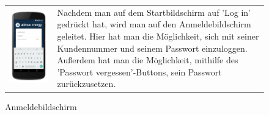 \begin{figure}[h]
\begin{tabularx}{\textwidth}{X  X}
	\includegraphics[scale = 0.155]{img/AndroidMockup/login} \caption {Anmeldebildschirm} &	Nachdem man auf dem Startbildschirm auf 'Log in' gedrückt hat, wird man auf den Anmeldebildschirm geleitet. Hier hat man die Möglichkeit, sich mit seiner Kundennummer und seinem Passwort einzuloggen. Außerdem hat man die Möglichkeit, mithilfe des 'Passwort vergessen'-Buttons, sein Passwort zurückzusetzen. \\ 
\end{tabularx}
\end{figure}


